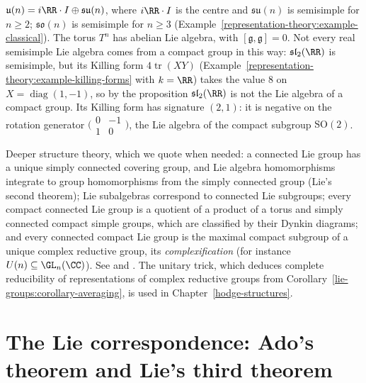 \begin{example}\label{lie-groups:example-compact-semisimple}
$\mathfrak{u}(n) = i\RR\cdot I \oplus \mathfrak{su}(n)$, where $i\RR \cdot I$ is the centre and $\mathfrak{su}(n)$ is semisimple for $n \geq 2$; $\mathfrak{so}(n)$ is semisimple for $n \geq 3$
(Example~\ref{representation-theory:example-classical}). The torus $T^n$ has abelian Lie algebra, with $[\mathfrak{g}, \mathfrak{g}] = 0$. Not every real semisimple Lie algebra comes from a
compact group in this way: $\mathfrak{sl}_2(\RR)$ is semisimple, but its Killing form $4\operatorname{tr}(XY)$ (Example~\ref{representation-theory:example-killing-forms}
with $k = \RR$) takes the value $8$ on $X = \operatorname{diag}(1, -1)$, so by the proposition $\mathfrak{sl}_2(\RR)$ is not the Lie algebra of a
compact group. Its Killing form has signature $(2, 1)$: it is negative on the rotation generator $\bigl(\begin{smallmatrix}0 & -1\\ 1 & 0\end{smallmatrix}\bigr)$, the Lie algebra of the
compact subgroup $\mathrm{SO}(2)$.
\end{example}
\begin{remark}\label{lie-groups:remark-structure}
Deeper structure theory, which we quote when needed: a connected Lie group has a unique simply connected covering group, and Lie algebra homomorphisms integrate to group homomorphisms from the simply
connected group (Lie's second theorem); Lie subalgebras correspond to connected Lie subgroups; every compact connected Lie group is a quotient of a product of a torus and simply connected compact simple
groups, which are classified by their Dynkin diagrams; and every connected compact Lie group is the maximal compact subgroup of a unique complex reductive group, its \emph{complexification} (for instance
$U(n) \subseteq \GL_n(\CC)$). See \cite{knapp-lie} and \cite{brocker-tomdieck}. The unitary trick, which deduces complete reducibility of representations of complex reductive groups from
Corollary~\ref{lie-groups:corollary-averaging}, is used in Chapter~\ref{hodge-structures}.
\end{remark}

\section{The Lie correspondence: Ado's theorem and Lie's third theorem}\label{lie-groups:section-correspondence}


